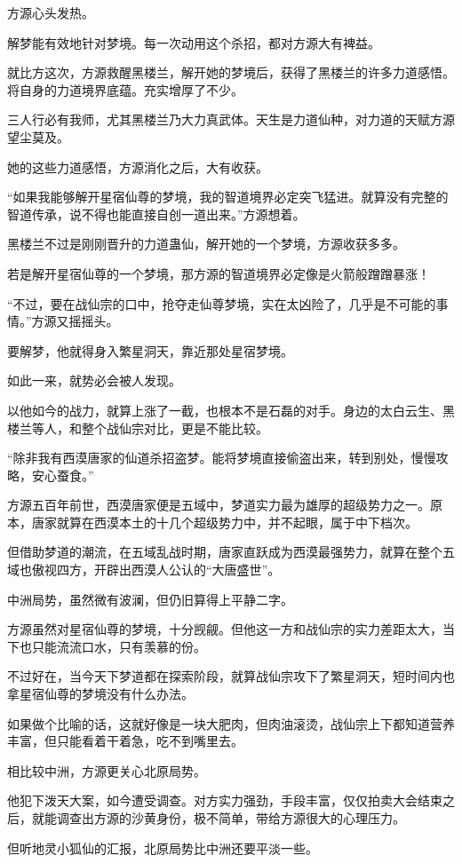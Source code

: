 \begin{this_body}
方源心头发热。

解梦能有效地针对梦境。每一次动用这个杀招，都对方源大有裨益。

就比方这次，方源救醒黑楼兰，解开她的梦境后，获得了黑楼兰的许多力道感悟。将自身的力道境界底蕴。充实增厚了不少。

三人行必有我师，尤其黑楼兰乃大力真武体。天生是力道仙种，对力道的天赋方源望尘莫及。

她的这些力道感悟，方源消化之后，大有收获。

“如果我能够解开星宿仙尊的梦境，我的智道境界必定突飞猛进。就算没有完整的智道传承，说不得也能直接自创一道出来。”方源想着。

黑楼兰不过是刚刚晋升的力道蛊仙，解开她的一个梦境，方源收获多多。

若是解开星宿仙尊的一个梦境，那方源的智道境界必定像是火箭般蹭蹭暴涨！

“不过，要在战仙宗的口中，抢夺走仙尊梦境，实在太凶险了，几乎是不可能的事情。”方源又摇摇头。

要解梦，他就得身入繁星洞天，靠近那处星宿梦境。

如此一来，就势必会被人发现。

以他如今的战力，就算上涨了一截，也根本不是石磊的对手。身边的太白云生、黑楼兰等人，和整个战仙宗对比，更是不能比较。

“除非我有西漠唐家的仙道杀招盗梦。能将梦境直接偷盗出来，转到别处，慢慢攻略，安心蚕食。”

方源五百年前世，西漠唐家便是五域中，梦道实力最为雄厚的超级势力之一。原本，唐家就算在西漠本土的十几个超级势力中，并不起眼，属于中下档次。

但借助梦道的潮流，在五域乱战时期，唐家直跃成为西漠最强势力，就算在整个五域也傲视四方，开辟出西漠人公认的“大唐盛世”。

中洲局势，虽然微有波澜，但仍旧算得上平静二字。

方源虽然对星宿仙尊的梦境，十分觊觎。但他这一方和战仙宗的实力差距太大，当下也只能流流口水，只有羡慕的份。

不过好在，当今天下梦道都在探索阶段，就算战仙宗攻下了繁星洞天，短时间内也拿星宿仙尊的梦境没有什么办法。

如果做个比喻的话，这就好像是一块大肥肉，但肉油滚烫，战仙宗上下都知道营养丰富，但只能看着干着急，吃不到嘴里去。

相比较中洲，方源更关心北原局势。

他犯下泼天大案，如今遭受调查。对方实力强劲，手段丰富，仅仅拍卖大会结束之后，就能调查出方源的沙黄身份，极不简单，带给方源很大的心理压力。

但听地灵小狐仙的汇报，北原局势比中洲还要平淡一些。


\end{this_body}
